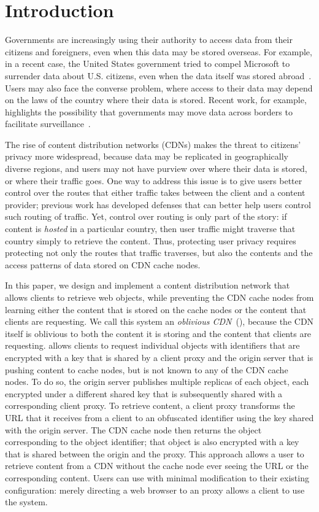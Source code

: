 \section{Introduction}
\label{sec:intro}

Governments are increasingly using their authority to access data from
their citizens and foreigners, even when this data may be stored overseas.  For
example, in a
recent case, the United States government tried to compel Microsoft to
surrender data about U.S. citizens, even when the data itself was stored
abroad~\cite{microsoft_ireland}. Users may also face the converse problem, where access to their data
may depend on the laws of the country where their data is stored. Recent work,
for example, highlights the possibility that governments may move data across
borders to facilitate surveillance~\cite{arnbak2015loopholes}.  

The rise of content distribution networks (CDNs) makes the threat to citizens'
privacy more widespread, because data may be replicated in geographically
diverse regions, and users may not have purview over where their data is
stored, or where their traffic goes.  One way to address this issue is to give
users better control over the routes that either traffic takes between the
client and a content provider; previous work has developed defenses that can
better help users control such routing of traffic. Yet, control over routing
is only part of the story: if content is {\em hosted} in a particular country,
then user traffic might traverse that country simply to retrieve the content.
Thus, protecting user privacy requires protecting not only the routes that
traffic traverses, but also the contents and the access patterns of data
stored on CDN cache nodes.

In this paper, we design and implement a content distribution network that
allows clients to retrieve web objects, while preventing the CDN cache nodes
from learning either the content that is stored on the cache nodes or the
content that clients are requesting. We call this system an {\em oblivious
CDN}~(\system{}), because the CDN itself is oblivious to both the content it is
storing and the content that clients are requesting. \system{} allows clients to
request individual objects with identifiers that are encrypted with a key that
is shared by a client proxy and the origin server that is pushing content to
cache nodes, but is not known to any of the CDN cache nodes.  To do so, the
origin server publishes multiple replicas of each object, each encrypted under
a different shared key that is subsequently shared with a corresponding client
proxy. To retrieve content, a client proxy transforms the URL that it receives
from a client to an obfuscated identifier using the key shared with the origin
server. The CDN cache node then returns the object corresponding to the object
identifier; that object is also encrypted with a key that is shared between
the origin and the proxy. This approach allows a user to retrieve content from
a CDN without the cache node ever seeing the URL or the corresponding content.
Users can use \system{} with minimal modification to their existing configuration:
merely directing a web browser to an \system{} proxy allows a client to use the
system.

